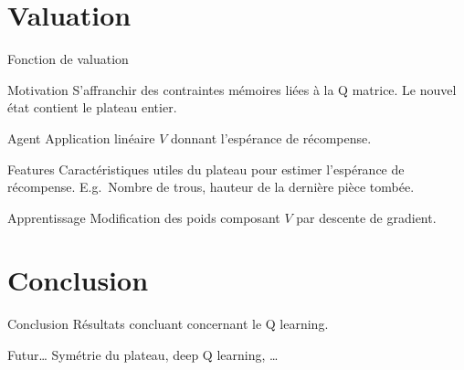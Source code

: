\documentclass[tikz, footheight=2em]{beamer}
\begin{document}
\section{Valuation}
\begin{frame}[c]{Fonction de valuation}
  \begin{block}{Motivation}
    S'affranchir des contraintes mémoires liées à la Q matrice. Le nouvel état
    contient le plateau entier.
  \end{block}
  \pause{}
  \begin{block}{Agent}
    Application linéaire \(V\) donnant l'espérance de récompense.
  \end{block}
  \pause{}
  \begin{exampleblock}{Features}
    Caractéristiques utiles du plateau pour estimer l'espérance de récompense.
    E.g.\ Nombre de trous, hauteur de la dernière pièce tombée.
  \end{exampleblock}
  \pause{}
  \begin{block}{Apprentissage}
    Modification des poids composant \(V\) par descente de gradient.
  \end{block}
\end{frame}

\section*{Conclusion}
\begin{frame}[c]{Conclusion}
  Résultats concluant concernant le Q learning.
  \begin{block}{Futur\dots}
    Symétrie du plateau, deep Q learning, \dots
  \end{block}
\end{frame}
\end{document}

